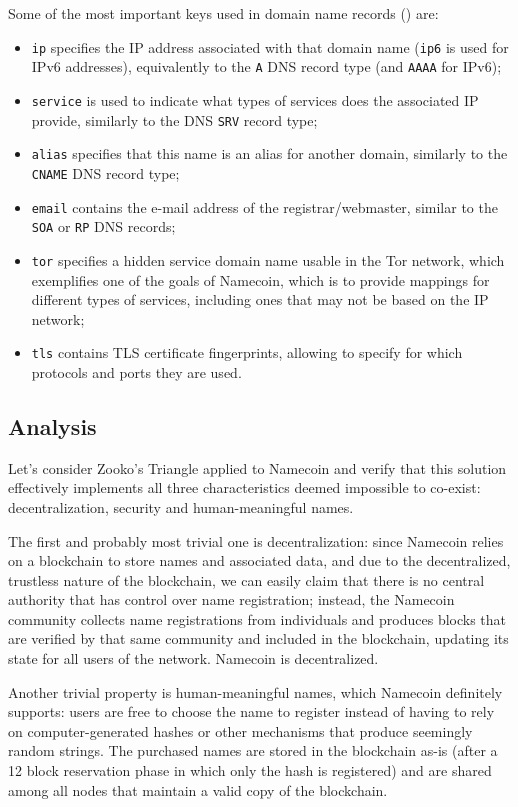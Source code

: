 \documentclass[mscthesis]{usiinfthesis}
\begin{document}
Some of the most important keys used in domain name records (\cite{website:namecoindomainwiki}) are:
\begin{itemize}
	\item \texttt{ip} specifies the IP address associated with that domain name (\texttt{ip6} is used for IPv6 addresses), equivalently to the \texttt{A} DNS record type (and \texttt{AAAA} for IPv6);
	\item \texttt{service} is used to indicate what types of services does the associated IP provide, similarly to the DNS \texttt{SRV} record type;
	\item \texttt{alias} specifies that this name is an alias for another domain, similarly to the \texttt{CNAME} DNS record type;
	\item \texttt{email} contains the e-mail address of the registrar/webmaster, similar to the \texttt{SOA} or \texttt{RP} DNS records;
	\item \texttt{tor} specifies a hidden service domain name usable in the Tor network, which exemplifies one of the goals of Namecoin, which is to provide mappings for different types of services, including ones that may not be based on the IP network;
	\item \texttt{tls} contains TLS certificate fingerprints, allowing to specify for which protocols and ports they are used.
\end{itemize}

\subsection{Analysis}
Let's consider Zooko's Triangle applied to Namecoin and verify that this solution effectively implements all three characteristics deemed impossible to co-exist: decentralization, security and human-meaningful names.

The first and probably most trivial one is decentralization: since Namecoin relies on a blockchain to store names and associated data, and due to the decentralized, trustless nature of the blockchain, we can easily claim that there is no central authority that has control over name registration; instead, the Namecoin community collects name registrations from individuals and produces blocks that are verified by that same community and included in the blockchain, updating its state for all users of the network. Namecoin is decentralized.

Another trivial property is human-meaningful names, which Namecoin definitely supports: users are free to choose the name to register instead of having to rely on computer-generated hashes or other mechanisms that produce seemingly random strings. The purchased names are stored in the blockchain as-is (after a 12 block reservation phase in which only the hash is registered) and are shared among all nodes that maintain a valid copy of the blockchain.
\end{document}
